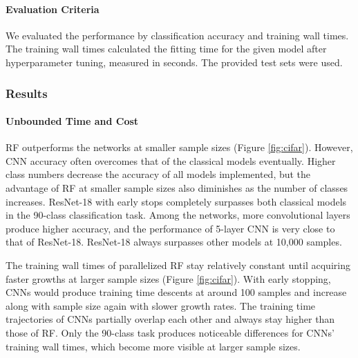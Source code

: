 \paragraph{Evaluation Criteria}
We evaluated the performance by classification accuracy and training wall times. The training wall times calculated the fitting time for the given model after hyperparameter tuning, measured in seconds. The provided test sets were used.

\subsubsection{Results}

\paragraph{Unbounded Time and Cost}
RF outperforms the networks at smaller sample sizes (Figure \ref{fig:cifar}). However, CNN accuracy often overcomes that of the classical models eventually. Higher class numbers decrease the accuracy of all models implemented, but the advantage of RF at smaller sample sizes also diminishes as the number of classes increases. ResNet-18 with early stops completely surpasses both classical models in the 90-class classification task. Among the networks, more convolutional layers produce higher accuracy, and the performance of 5-layer CNN is very close to that of ResNet-18. ResNet-18 always surpasses other models at 10,000 samples.

The training wall times of parallelized RF stay relatively constant until acquiring faster growths at larger sample sizes (Figure \ref{fig:cifar}). With early stopping, CNNs would produce training time descents at around 100 samples and increase along with sample size again with slower growth rates. The training time trajectories of CNNs partially overlap each other and always stay higher than those of RF. Only the 90-class task produces noticeable differences for CNNs' training wall times, which become more visible at larger sample sizes.

